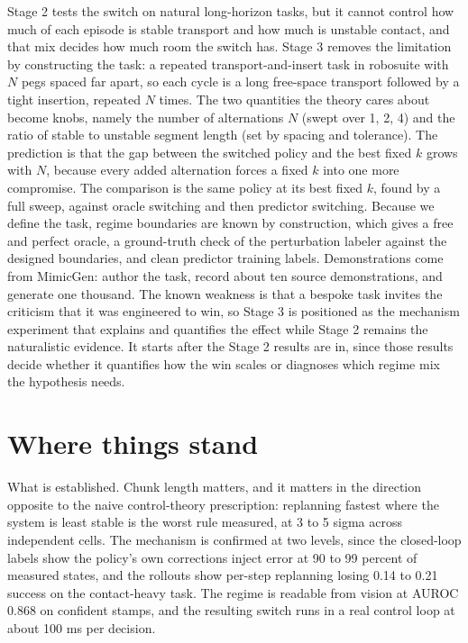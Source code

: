 \documentclass[11pt]{article}
\begin{document}
Stage 2 tests the switch on natural long-horizon tasks, but it cannot control
how much of each episode is stable transport and how much is unstable
contact, and that mix decides how much room the switch has. Stage 3 removes
the limitation by constructing the task: a repeated transport-and-insert task
in robosuite with $N$ pegs spaced far apart, so each cycle is a long
free-space transport followed by a tight insertion, repeated $N$ times. The
two quantities the theory cares about become knobs, namely the number of
alternations $N$ (swept over 1, 2, 4) and the ratio of stable to unstable
segment length (set by spacing and tolerance). The prediction is that the gap
between the switched policy and the best fixed $k$ grows with $N$, because
every added alternation forces a fixed $k$ into one more compromise. The
comparison is the same policy at its best fixed $k$, found by a full sweep,
against oracle switching and then predictor switching. Because we define the
task, regime boundaries are known by construction, which gives a free and
perfect oracle, a ground-truth check of the perturbation labeler against the
designed boundaries, and clean predictor training labels. Demonstrations come
from MimicGen: author the task, record about ten source demonstrations, and
generate one thousand. The known weakness is that a bespoke task invites the
criticism that it was engineered to win, so Stage 3 is positioned as the
mechanism experiment that explains and quantifies the effect while Stage 2
remains the naturalistic evidence. It starts after the Stage 2 results are
in, since those results decide whether it quantifies how the win scales or
diagnoses which regime mix the hypothesis needs.

\section{Where things stand}

What is established. Chunk length matters, and it matters in the direction
opposite to the naive control-theory prescription: replanning fastest where
the system is least stable is the worst rule measured, at 3 to 5 sigma across
independent cells. The mechanism is confirmed at two levels, since the
closed-loop labels show the policy's own corrections inject error at 90 to 99
percent of measured states, and the rollouts show per-step replanning losing
0.14 to 0.21 success on the contact-heavy task. The regime is readable from
vision at AUROC 0.868 on confident stamps, and the resulting switch runs in a
real control loop at about 100 ms per decision.
\end{document}
